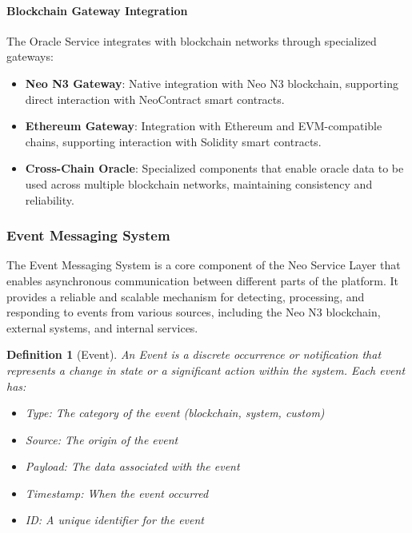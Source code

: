 \documentclass{article}
\newtheorem{definition}{Definition}
\begin{document}
\paragraph{Blockchain Gateway Integration}
The Oracle Service integrates with blockchain networks through specialized gateways:

\begin{itemize}
    \item \textbf{Neo N3 Gateway}: Native integration with Neo N3 blockchain, supporting direct interaction with NeoContract smart contracts.
    
    \item \textbf{Ethereum Gateway}: Integration with Ethereum and EVM-compatible chains, supporting interaction with Solidity smart contracts.
    
    \item \textbf{Cross-Chain Oracle}: Specialized components that enable oracle data to be used across multiple blockchain networks, maintaining consistency and reliability.
\end{itemize}

\subsubsection{Event Messaging System}
\label{subsubsec:event-messaging}

The Event Messaging System is a core component of the Neo Service Layer that enables asynchronous communication between different parts of the platform. It provides a reliable and scalable mechanism for detecting, processing, and responding to events from various sources, including the Neo N3 blockchain, external systems, and internal services.



\begin{definition}[Event]
An Event is a discrete occurrence or notification that represents a change in state or a significant action within the system. Each event has:
\begin{itemize}
    \item Type: The category of the event (blockchain, system, custom)
    \item Source: The origin of the event
    \item Payload: The data associated with the event
    \item Timestamp: When the event occurred
    \item ID: A unique identifier for the event
\end{itemize}
\end{definition}
\end{document}

